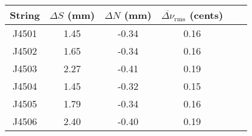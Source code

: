 \begin{tabular}{cccccc}
\toprule
String & $\Delta S$ (mm) & $\Delta N$ (mm) & $\overline{\Delta \nu}_\text{rms}$ (cents) \\
\midrule
J4501 & 1.45 & -0.34 & 0.16 \\
J4502 & 1.65 & -0.34 & 0.16 \\
J4503 & 2.27 & -0.41 & 0.19 \\
J4504 & 1.45 & -0.32 & 0.15 \\
J4505 & 1.79 & -0.34 & 0.16 \\
J4506 & 2.40 & -0.40 & 0.19 \\
\bottomrule
\end{tabular}

